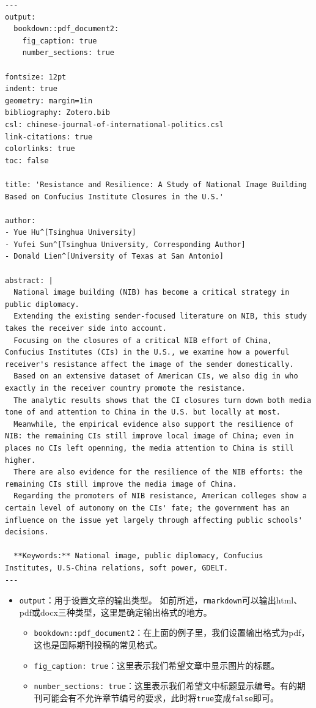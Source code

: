 \documentclass[
  letterpaper,
  DIV=11,
  numbers=noendperiod,
  oneside]{scrreprt}
\providecommand{\tightlist}{%
  \setlength{\itemsep}{0pt}\setlength{\parskip}{0pt}}\usepackage{longtable,booktabs,array}
\begin{document}
\begin{verbatim}
---
output: 
  bookdown::pdf_document2:
    fig_caption: true
    number_sections: true

fontsize: 12pt
indent: true
geometry: margin=1in
bibliography: Zotero.bib
csl: chinese-journal-of-international-politics.csl
link-citations: true
colorlinks: true
toc: false

title: 'Resistance and Resilience: A Study of National Image Building Based on Confucius Institute Closures in the U.S.'

author:
- Yue Hu^[Tsinghua University]
- Yufei Sun^[Tsinghua University, Corresponding Author]
- Donald Lien^[University of Texas at San Antonio]

abstract: |
  National image building (NIB) has become a critical strategy in public diplomacy.
  Extending the existing sender-focused literature on NIB, this study takes the receiver side into account.
  Focusing on the closures of a critical NIB effort of China, Confucius Institutes (CIs) in the U.S., we examine how a powerful receiver's resistance affect the image of the sender domestically.
  Based on an extensive dataset of American CIs, we also dig in who exactly in the receiver country promote the resistance.
  The analytic results shows that the CI closures turn down both media tone of and attention to China in the U.S. but locally at most.
  Meanwhile, the empirical evidence also support the resilience of NIB: the remaining CIs still improve local image of China; even in places no CIs left openning, the media attention to China is still higher.
  There are also evidence for the resilience of the NIB efforts: the remaining CIs still improve the media image of China.
  Regarding the promoters of NIB resistance, American colleges show a certain level of autonomy on the CIs' fate; the government has an influence on the issue yet largely through affecting public schools' decisions.
  
  **Keywords:** National image, public diplomacy, Confucius Institutes, U.S-China relations, soft power, GDELT.
---
\end{verbatim}

\begin{itemize}
\tightlist
\item
  \texttt{output}：用于设置文章的输出类型。
  如前所述，\texttt{rmarkdown}可以输出html、pdf或docx三种类型，这里是确定输出格式的地方。

  \begin{itemize}
  \tightlist
  \item
    \texttt{bookdown::pdf\_document2}：在上面的例子里，我们设置输出格式为pdf，这也是国际期刊投稿的常见格式。
  \item
    \texttt{fig\_caption:\ true}：这里表示我们希望文章中显示图片的标题。
  \item
    \texttt{number\_sections:\ true}：这里表示我们希望文中标题显示编号。有的期刊可能会有不允许章节编号的要求，此时将\texttt{true}变成\texttt{false}即可。
  \end{itemize}
\end{itemize}
\end{document}
